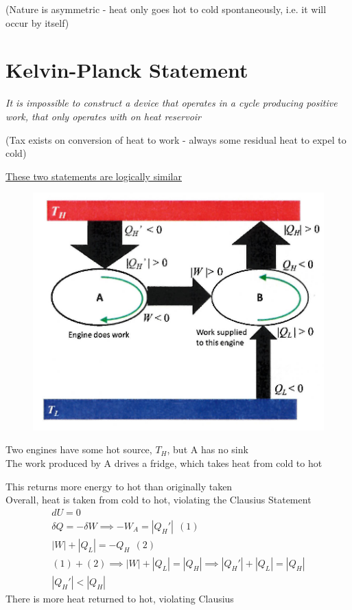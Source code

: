 \documentclass[a4paper, 11pt, normalem]{report}
\begin{document}
(Nature is asymmetric - heat only goes hot to cold spontaneously, i.e. it will occur by itself)

\section{Kelvin-Planck Statement}
\emph{It is impossible to construct a device that operates in a cycle producing positive work, that only operates with on heat reservoir}

(Tax exists on conversion of heat to work - always some residual heat to expel to cold)

\underline{These two statements are logically similar}

\begin{figure}
    \begin{center}
        \vspace{-10pt}
        \includegraphics[scale=0.4]{KelvinClause.png}
        \vspace{-70pt}
    \end{center}
\end{figure}

Two engines have some hot source, $T_H$, but A has no sink \\
The work produced by A drives a fridge, which takes heat from cold to hot

This returns more energy to hot than originally taken \\
Overall, heat is taken from cold to hot, violating the Clausius Statement
\begin{gather*}
    dU = 0 \\
    \delta Q = - \delta W \implies -W_A = |Q_{H}'| ~~ (1) \\
    |W| + |Q_{L}| = -Q_{H} ~~ (2) \\
    (1) + (2) \implies |W| + |Q_{L}| = |Q_{H}| \implies |Q_{H}'| + |Q_{L}| = |Q_{H}| \\
    |Q_{H}'| < |Q_{H}|
\end{gather*}
There is more heat returned to hot, violating Clausius
\end{document}
